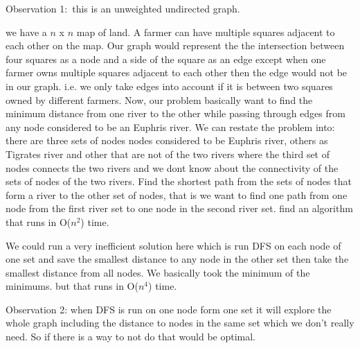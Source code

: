 \documentclass[12pt,twoside]{article}
\begin{document}
\begin{problems}
Observation 1$:$ this is an unweighted undirected graph.

we have a $n$ x $n$ map of land. A farmer can have multiple squares adjacent to each other on the map. Our graph would represent the the intersection between four squares as a node and a side of the square as an edge except when one farmer owns multiple squares adjacent to each other then the edge would not be in our graph. i.e. we only take edges into account if it is between two squares owned by different farmers. Now, our problem basically want to find the minimum distance from one river to the other while passing through edges from any node considered to be an Euphris river. We can restate the problem into: there are three sets of nodes nodes considered to be Euphris river, others as Tigrates river and other that are not of the two rivers where the third set of nodes connects the two rivers and we dont know about the connectivity of the sets of nodes of the two rivers. Find the shortest path from the sets of nodes that form a river to the other set of nodes, that is we want to find one path from one node from the first river set to one node in the second river set. find an algorithm that runs in O($n^2$) time.


We could run a very inefficient solution here which is run DFS on each node of one set and save the smallest distance to any node in the other set then take the smallest distance from all nodes. We basically took the minimum of the minimums. but that runs in O($n^4$) time.

Observation 2: when DFS is run on one node form one set it will explore the whole graph including the distance to nodes in the same set which we don't really need. So if there is a way to not do that would be optimal.


\end{problems}
\end{document}
